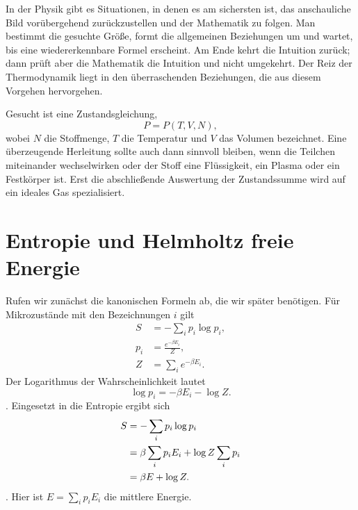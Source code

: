 In der Physik gibt es Situationen, in denen es am sichersten ist, das anschauliche Bild vorübergehend zurückzustellen und der Mathematik zu folgen. Man bestimmt die gesuchte Größe, formt die allgemeinen Beziehungen um und wartet, bis eine wiedererkennbare Formel erscheint. Am Ende kehrt die Intuition zurück; dann prüft aber die Mathematik die Intuition und nicht umgekehrt. Der Reiz der Thermodynamik liegt in den überraschenden Beziehungen, die aus diesem Vorgehen hervorgehen.

Gesucht ist eine Zustandsgleichung, \begin{equation}
 P=P(T,V,N),
 \label{eq:sm5-equation-of-state-target}
\end{equation} wobei \(N\) die Stoffmenge, \(T\) die Temperatur und \(V\) das Volumen bezeichnet. Eine überzeugende Herleitung sollte auch dann sinnvoll bleiben, wenn die Teilchen miteinander wechselwirken oder der Stoff eine Flüssigkeit, ein Plasma oder ein Festkörper ist. Erst die abschließende Auswertung der Zustandssumme wird auf ein ideales Gas spezialisiert.

\section{Entropie und Helmholtz freie Energie}

Rufen wir zunächst die kanonischen Formeln ab, die wir später benötigen. Für Mikrozustände mit den Bezeichnungen \(i\) gilt \begin{equation}
 \begin{aligned}
 S&=-\sum_i p_i\log p_i,\\
 p_i&=\frac{e^{-\beta E_i}}{Z},\\
 Z&=\sum_i e^{-\beta E_i}.
 \end{aligned}
 \label{eq:sm5-canonical-definitions}
\end{equation} Der Logarithmus der Wahrscheinlichkeit lautet \begin{equation}
 \log p_i=-\beta E_i-\log Z.
 \label{eq:sm5-log-probability}
\end{equation}. Eingesetzt in die Entropie ergibt sich \begin{align}
 S
 &=-\sum_i p_i\log p_i \notag\\
 &=\beta\sum_i p_iE_i+\log Z\sum_i p_i \notag\\
 &=\beta E+\log Z.
 \label{eq:sm5-entropy-log-z}
\end{align}. Hier ist \(E=\sum_i p_iE_i\) die mittlere Energie.

\begin{classroomqa}\end{classroomqa}


